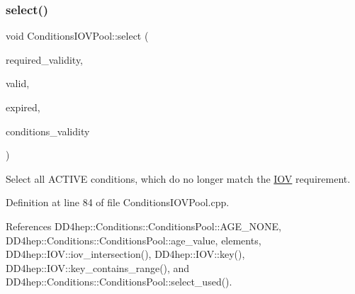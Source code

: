 \subsubsection{\texorpdfstring{select()}{select()}\hspace{0.1cm}{\footnotesize\ttfamily [2/2]}}
{\footnotesize\ttfamily void Conditions\+I\+O\+V\+Pool\+::select (\begin{DoxyParamCaption}\item[{const \hyperlink{class_d_d4hep_1_1_conditions_1_1_condition_ad84300e226b2085ec5e9db7f47be5539}{Condition\+::iov\+\_\+type} \&}]{required\+\_\+validity,  }\item[{\hyperlink{namespace_d_d4hep_1_1_conditions_ae765f0140a33973a430280f02b6062f4}{Range\+Conditions} \&}]{valid,  }\item[{\hyperlink{namespace_d_d4hep_1_1_conditions_ae765f0140a33973a430280f02b6062f4}{Range\+Conditions} \&}]{expired,  }\item[{\hyperlink{class_d_d4hep_1_1_conditions_1_1_condition_ad84300e226b2085ec5e9db7f47be5539}{Condition\+::iov\+\_\+type} \&}]{conditions\+\_\+validity }\end{DoxyParamCaption})}



Select all A\+C\+T\+I\+VE conditions, which do no longer match the \hyperlink{class_d_d4hep_1_1_i_o_v}{I\+OV} requirement. 



Definition at line 84 of file Conditions\+I\+O\+V\+Pool.\+cpp.



References D\+D4hep\+::\+Conditions\+::\+Conditions\+Pool\+::\+A\+G\+E\+\_\+\+N\+O\+NE, D\+D4hep\+::\+Conditions\+::\+Conditions\+Pool\+::age\+\_\+value, elements, D\+D4hep\+::\+I\+O\+V\+::iov\+\_\+intersection(), D\+D4hep\+::\+I\+O\+V\+::key(), D\+D4hep\+::\+I\+O\+V\+::key\+\_\+contains\+\_\+range(), and D\+D4hep\+::\+Conditions\+::\+Conditions\+Pool\+::select\+\_\+used().

\hypertarget{class_d_d4hep_1_1_conditions_1_1_conditions_i_o_v_pool_a09fb206aaa3c86d249598b7eaa58b322}{}\label{class_d_d4hep_1_1_conditions_1_1_conditions_i_o_v_pool_a09fb206aaa3c86d249598b7eaa58b322} 

